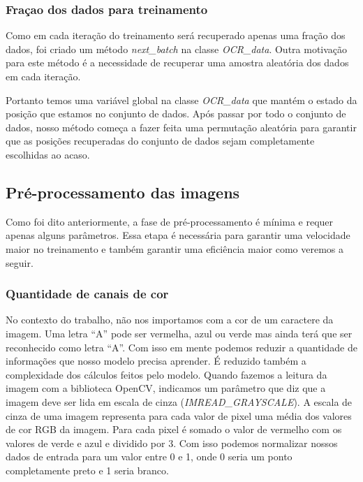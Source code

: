 \subsubsection{Fraçao dos dados para treinamento}

Como em cada iteração do treinamento será recuperado apenas uma fração
dos dados, foi criado um método \textit{next\_batch} na classe
\textit{OCR\_data}. Outra motivação para este método é a necessidade de
recuperar uma amostra aleatória dos dados em cada iteração. 

Portanto temos uma variável global na classe \textit{OCR\_data} que
mantém o estado da posição que estamos no conjunto de dados. Após
passar por todo o conjunto de dados, nosso método começa a fazer feita
uma permutação aleatória para garantir que as posições recuperadas do
conjunto de dados sejam completamente escolhidas ao acaso.

\subsection{Pré-processamento das imagens}

Como foi dito anteriormente, a fase de pré-processamento é mínima e
requer apenas alguns parâmetros. Essa etapa é necessária para garantir
uma velocidade maior no treinamento e também garantir uma eficiência
maior como veremos a seguir.

\subsubsection{Quantidade de canais de cor}

No contexto do trabalho, não nos importamos com a cor de um caractere
da imagem. Uma letra ``A'' pode ser vermelha, azul ou verde mas ainda
terá que ser reconhecido como letra ``A''. Com isso em mente podemos
reduzir a quantidade de informações que nosso modelo precisa
aprender. É reduzido também a complexidade dos cálculos feitos pelo
modelo. Quando fazemos a leitura da imagem com a biblioteca OpenCV,
indicamos um parâmetro que diz que a imagem deve ser lida em escala de
cinza (\textit{IMREAD\_GRAYSCALE}). A escala de cinza de uma imagem
representa para cada valor de pixel uma média dos valores de cor RGB
da imagem. Para cada pixel é somado o valor de vermelho com os valores
de verde e azul e dividido por 3. Com isso podemos normalizar nossos
dados de entrada para um valor entre 0 e 1, onde 0 seria um ponto
completamente preto e 1 seria branco.

